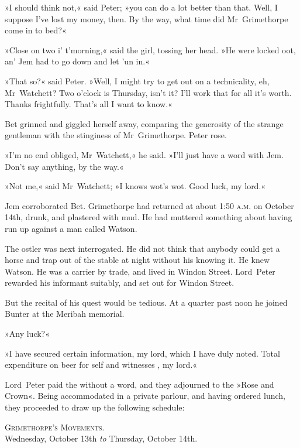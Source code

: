 »I should think not,« said Peter; »you can do a lot better than that. Well, I suppose I've lost my money, then. By the way, what time did Mr~Grimethorpe come in to bed?«

»Close on two i' t'morning,« said the girl, tossing her head. »He were locked oot, an' Jem had to go down and let 'un in.«

»That so?« said Peter. »Well, I might try to get out on a technicality, eh, Mr~Watchett? Two o'clock is Thursday, isn't it? I'll work that for all it's worth. Thanks frightfully. That's all I want to know.«

Bet grinned and giggled herself away, comparing the generosity of the strange gentleman with the stinginess of Mr~Grimethorpe. Peter rose.

»I'm no end obliged, Mr~Watchett,« he said. »I'll just have a word with Jem. Don't say anything, by the way.«

»Not me,« said Mr~Watchett; »I knows wot's wot. Good luck, my lord.«

Jem corroborated Bet. Grimethorpe had returned at about 1:50 \textsc{a.m.} on October 14th, drunk, and plastered with mud. He had muttered something about having run up against a man called Watson.

The ostler was next interrogated. He did not think that anybody could get a horse and trap out of the stable at night without his knowing it. He knew Watson. He was a carrier by trade, and lived in Windon Street. Lord~Peter rewarded his informant suitably, and set out for Windon Street.

But the recital of his quest would be tedious. At a quarter past noon he joined Bunter at the Meribah memorial.

»Any luck?«

»I have secured certain information, my lord, which I have duly noted. Total expenditure on beer for self and witnesses , my lord.«

Lord~Peter paid the  without a word, and they adjourned to the »Rose and Crown«. Being accommodated in a private parlour, and having ordered lunch, they proceeded to draw up the following schedule:

\begin{a4}
\clearpage
\end{a4}

\begin{center}
\textsc{Grimethorpe's Movements.}\\Wednesday, October 13th \textit{to} Thursday, October 14th.
\end{center}

